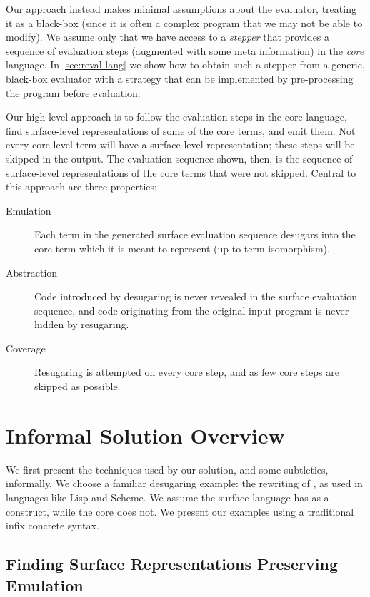 Our approach instead makes minimal assumptions about the
evaluator, treating it as a black-box (since it is often a complex
program that we may not be able to modify).
We assume only that we have access to a \emph{stepper} that
provides a sequence of evaluation steps (augmented with some
meta information) in the \emph{core} language. In 
\cref{sec:reval-lang} we show how to obtain such a stepper from a generic,
black-box
evaluator with a strategy that can be implemented by pre-processing
the program before evaluation.

Our high-level approach is to follow the evaluation steps in the core
language, find surface-level representations of some of the core
terms, and emit them. Not every core-level term will have a
surface-level representation; these steps will be skipped in the
output. The evaluation sequence shown, then, is the sequence of
surface-level representations of the core terms that were not
skipped. Central to this approach are three properties:

\begin{description}
\item[Emulation] Each term in the generated surface evaluation
  sequence desugars into the core term which it is meant to represent
  (up to term isomorphism).
\item[Abstraction] Code introduced by desugaring is never revealed in the
  surface evaluation sequence, and code originating from the original
  input program is never hidden by resugaring.
\item[Coverage] Resugaring is attempted on every core step, and as few
  core steps are skipped as possible.
\end{description}

\section{Informal Solution Overview}
\label{sec:reval-exposition}

We first present the techniques used by our solution, and some subtleties,
informally. We choose a familiar desugaring example: the rewriting
of , as used in languages like Lisp and Scheme. We assume
the surface language has  as a construct, while the core does
not. We present our examples using a traditional infix concrete syntax.

\subsection{Finding Surface Representations Preserving Emulation}

